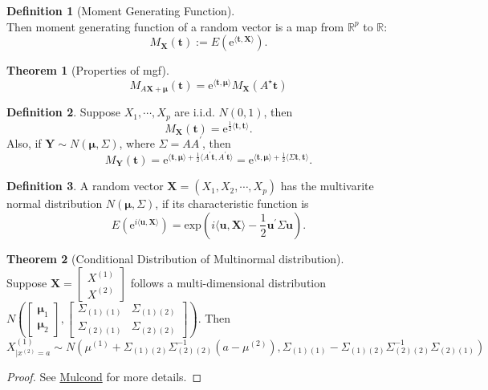 \documentclass[12pt]{book}
\theoremstyle{definition}
\newtheorem{definition}{Definition}[chapter]
\newtheorem{theorem}{Theorem}[chapter]
\newcommand{\inner}[2]{{\langle #1,#2\rangle}}
\newcommand{\R}{\mathbb{R}}
\newcommand{\E}{\mathrm{e}}
\newcommand{\X}{\mathbf{X}}
\newcommand{\Y}{\mathbf{Y}}
\newcommand{\U}{\mathbf{u}}
\begin{document}
\begin{definition}[Moment Generating Function] \ \\
Then moment generating function of a random vector is a map from $\R^p$ to $\R$:
$$
M_\X(\mathbf{t}):=E(\E^{\inner{\mathbf t}{\X}}).
$$
\end{definition}

\begin{theorem}[Properties of mgf] \ \\
$$
M_{A\X+\mathbf{\mu}}(\mathbf t)=\E^{\inner{\mathbf t}{\mathbf \mu}}M_{\X}(A^\star \mathbf t)
$$
\end{theorem}

\begin{definition}
Suppose $X_1,\cdots,X_p$ are i.i.d. $N(0,1)$, then 
$$
M_\X(\mathbf t) = \E^{\frac{1}{2}\inner{\mathbf t}{\mathbf t}}.
$$	
Also, if $\Y \sim N(\mathbf \mu,\Sigma)$, where $\Sigma = AA^\prime$, then 
$$
M_\Y(\mathbf t) = \E^{\inner{\mathbf t}{\mathbf \mu}+\frac{1}{2}\inner{A^\prime \mathbf t}{A^\prime \mathbf t}}=\E^{\inner{\mathbf t}{\mathbf \mu}+\frac{1}{2}\inner{\Sigma \mathbf t}{ \mathbf t}}.
$$
\end{definition}



\begin{definition}
A random vector $\X = (X_1,X_2,\cdots,X_p)$ has the multivarite normal distribution $N(\mathbf{\mu}, \Sigma)$, if its characteristic function is 
$$
E(\E^{i\inner{\U}{\X}}) = \mathrm{exp} \left( i\inner{\U}{\X} - \frac{1}{2} \U^\prime \Sigma \U\right).
$$
\end{definition}

\begin{theorem}[Conditional Distribution of Multinormal distribution] \ \\
Suppose $\X = \begin{bmatrix}
	X^{(1)} \\
	X^{(2)}
\end{bmatrix}$ follows a multi-dimensional distribution $N(\begin{bmatrix}
	\mathbf \mu_1 \\
	\mathbf \mu_2 
\end{bmatrix} , \begin{bmatrix}
	\Sigma_{(1)(1)} & \Sigma_{(1)(2)} \\
	\Sigma_{(2)(1)} & \Sigma_{(2)(2)}
\end{bmatrix})$.
Then $X^{(1)}_{|x^{(2)}=a} \sim N(\mu^{(1)}+\Sigma_{(1)(2)}\Sigma_{(2)(2)}^{-1}(a-\mu^{(2)}),\Sigma_{(1)(1)}-\Sigma_{(1)(2)}\Sigma_{(2)(2)}^{-1}\Sigma_{(2)(1)})$	
\end{theorem}
\begin{proof}
See \href{https://statproofbook.github.io/P/mvn-cond}{Mulcond} for more details.
\end{proof}
\end{document}
